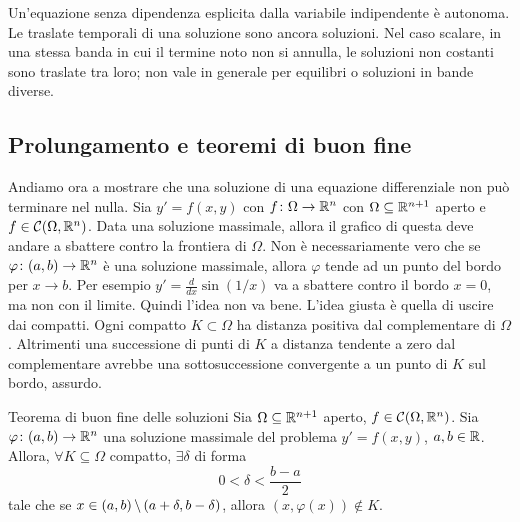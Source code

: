 \documentclass[a4paper]{article}
\begin{document}
\begin{radioactive}
Un'equazione senza dipendenza esplicita dalla variabile indipendente è autonoma.
Le traslate temporali di una soluzione sono ancora soluzioni.
Nel caso scalare, in una stessa banda in cui il termine noto non si annulla,
le soluzioni non costanti sono traslate tra loro; non vale in generale
per equilibri o soluzioni in bande diverse.

\end{radioactive}

\subsection{Prolungamento e teoremi di buon fine}

\begin{radioactive}
Andiamo ora a mostrare che una soluzione di una equazione differenziale non può terminare nel nulla.
Sia \(y' = f(x,y)\) con \(f \colon \Omega \to \mathbb{R}^n\)
con \(\Omega \subseteq \mathbb{R}^{n+1}\) aperto e \(f\in \mathcal C(\Omega, \mathbb{R}^n)\).
Data una soluzione massimale, allora il grafico di questa deve andare a sbattere contro
la frontiera di \(\Omega\).
Non è necessariamente vero che se \(\varphi \colon (a,b) \to \mathbb{R}^n\)
è una soluzione massimale, allora \(\varphi\) tende ad un punto del bordo per \(x \to b\).
Per esempio \(y' = \frac{d}{dx} \sin(1/x)\) va a sbattere contro il bordo \(x=0\),
ma non con il limite. Quindi l'idea non va bene.
L'idea giusta è quella di uscire dai compatti.
Ogni compatto \(K\subset\Omega\) ha distanza positiva dal complementare
di \(\Omega\). Altrimenti una successione di punti di \(K\) a distanza
tendente a zero dal complementare avrebbe una sottosuccessione convergente
a un punto di \(K\) sul bordo, assurdo.
\end{radioactive}

\begin{radioactive}
\begin{snippettheorem}{Teorema di buon fine delle soluzioni}
    Sia \(\Omega \subseteq \mathbb{R}^{n+1}\) aperto,
    \(f \in \mathcal C(\Omega, \mathbb{R}^n)\).
    Sia \(\varphi \colon (a,b) \to \mathbb{R}^n\)
    una soluzione massimale del problema \(y'=f(x,y)\),
    \(a,b\in \mathbb{R}\).
    Allora, \(\forall K \subseteq \Omega\) compatto, \(\exists \delta\)
    di forma \[  0 < \delta < \frac{b-a}{2} \]
    tale che se \(x\in (a,b) \,\backslash\, (a + \delta, b - \delta)\),
    allora \((x, \varphi(x)) \notin K\).
\end{snippettheorem}
\end{radioactive}
\end{document}
